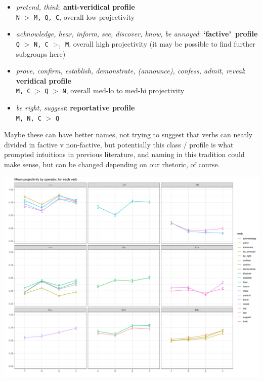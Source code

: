 \documentclass[10pt]{article}\usepackage[]{graphicx}\usepackage[dvipsnames]{xcolor}
\newenvironment{knitrout}{}{} %
\begin{document}
\begin{itemize}
  \item \emph{pretend, think}: \textbf{anti-veridical profile}\\
    \texttt{N} $>$ \texttt{M, Q, C}, overall low projectivity

  \item \emph{acknowledge, hear, inform, see, discover, know, be annoyed}: \textbf{\lq factive\rq\ profile}\\
    \texttt{Q} $>$ \texttt{N, C} \textcolor{gray}{$>_?$} \texttt{M}, overall high projectivity (it may be possible to find further subgroups here)

  \item \emph{prove, confirm, establish, demonstrate, (announce), confess, admit, reveal}: \textbf{veridical profile}\\
    \texttt{M, C} $>$ \texttt{Q} $>$ \texttt{N}, overall med-lo to med-hi projectivity
  
  \item \emph{be right, suggest}: \textbf{reportative profile}\\
    \texttt{M, N, C} $>$ \texttt{Q}

\end{itemize}

Maybe these can have better names, not trying to suggest that verbs can neatly divided in factive v non-factive, but potentially this class / profile is what prompted intuitions in previous literature, and naming in this tradition could make sense, but can be changed depending on our rhetoric, of course.


\newpage

\begin{knitrout}
\color{fgcolor}

{\centering \includegraphics[width=\linewidth]{figures/verb-profiles-3-1} 

}


\end{knitrout}
\end{document}
